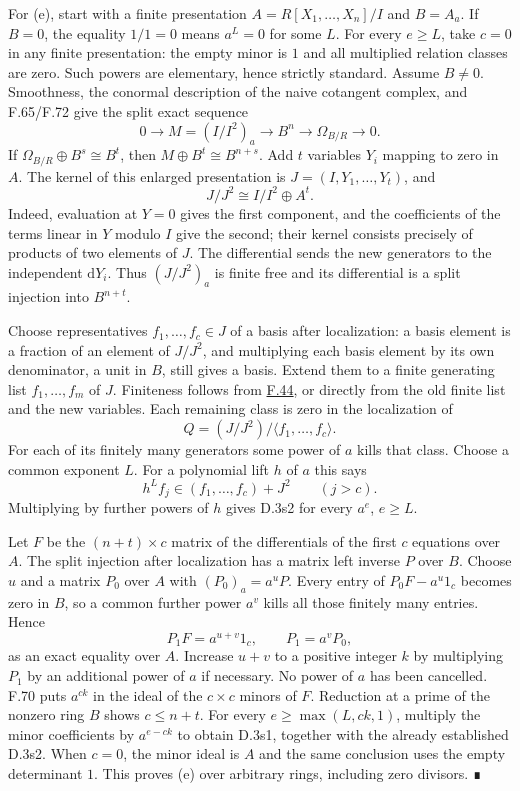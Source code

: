 \documentclass[11pt,a4paper,openany]{report}
\begin{document}
For (e), start with a finite presentation \(A=R[X_1,\ldots,X_n]/I\) and \(B=A_a\). If \(B=0\), the equality \(1/1=0\) means \(a^L=0\) for some \(L\). For every \(e\ge L\), take \(c=0\) in any finite presentation: the empty minor is \(1\) and all multiplied relation classes are zero. Such powers are elementary, hence strictly standard. Assume \(B\ne0\). Smoothness, the conormal description of the naive cotangent complex, and F.65/F.72 give the split exact sequence \[0\to M=(I/I^2)_a\to B^n\to\Omega_{B/R}\to0.\] If \(\Omega_{B/R}\oplus B^s\cong B^t\), then \(M\oplus B^t\cong B^{n+s}\). Add \(t\) variables \(Y_i\) mapping to zero in \(A\). The kernel of this enlarged presentation is \(J=(I,Y_1,\ldots,Y_t)\), and \[J/J^2\cong I/I^2\oplus A^t.\] Indeed, evaluation at \(Y=0\) gives the first component, and the coefficients of the terms linear in \(Y\) modulo \(I\) give the second; their kernel consists precisely of products of two elements of \(J\). The differential sends the new generators to the independent \(\mathrm dY_i\). Thus \((J/J^2)_a\) is finite free and its differential is a split injection into \(B^{n+t}\).

Choose representatives \(f_1,\ldots,f_c\in J\) of a basis after localization: a basis element is a fraction of an element of \(J/J^2\), and multiplying each basis element by its own denominator, a unit in \(B\), still gives a basis. Extend them to a finite generating list \(f_1,\ldots,f_m\) of \(J\). Finiteness follows from \hyperref[AG-RG-S05-algebra-lemma-finite-presentation-independent]{F.44}, or directly from the old finite list and the new variables. Each remaining class is zero in the localization of \[Q=(J/J^2)/\langle f_1,\ldots,f_c\rangle.\] For each of its finitely many generators some power of \(a\) kills that class. Choose a common exponent \(L\). For a polynomial lift \(h\) of \(a\) this says \[h^L f_j\in(f_1,\ldots,f_c)+J^2\qquad(j>c).\] Multiplying by further powers of \(h\) gives D.3s2 for every \(a^e\), \(e\ge L\).

Let \(F\) be the \((n+t)\times c\) matrix of the differentials of the first \(c\) equations over \(A\). The split injection after localization has a matrix left inverse \(P\) over \(B\). Choose \(u\) and a matrix \(P_0\) over \(A\) with \((P_0)_a=a^uP\). Every entry of \(P_0F-a^u1_c\) becomes zero in \(B\), so a common further power \(a^v\) kills all those finitely many entries. Hence \[P_1F=a^{u+v}1_c,\qquad P_1=a^vP_0,\] as an exact equality over \(A\). Increase \(u+v\) to a positive integer \(k\) by multiplying \(P_1\) by an additional power of \(a\) if necessary. No power of \(a\) has been cancelled. F.70 puts \(a^{ck}\) in the ideal of the \(c\times c\) minors of \(F\). Reduction at a prime of the nonzero ring \(B\) shows \(c\le n+t\). For every \(e\ge\max(L,ck,1)\), multiply the minor coefficients by \(a^{e-ck}\) to obtain D.3s1, together with the already established D.3s2. When \(c=0\), the minor ideal is \(A\) and the same conclusion uses the empty determinant \(1\). This proves (e) over arbitrary rings, including zero divisors. ∎
\end{document}

